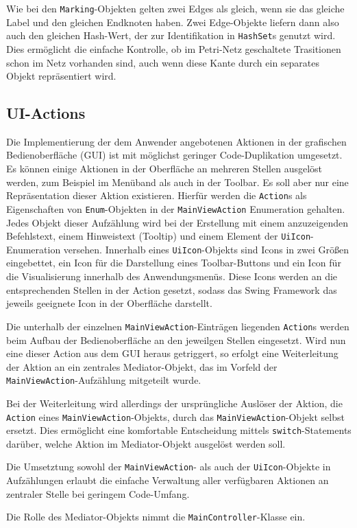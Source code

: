 Wie bei den \texttt{Marking}-Objekten gelten zwei Edges als gleich, wenn sie das
gleiche Label und den gleichen Endknoten haben. Zwei Edge-Objekte liefern dann
also auch den gleichen Hash-Wert, der zur Identifikation in \texttt{HashSet}s
genutzt wird. Dies ermöglicht die einfache Kontrolle, ob im Petri-Netz
geschaltete Trasitionen schon im Netz vorhanden sind, auch wenn diese Kante
durch ein separates Objekt repräsentiert wird.

\subsection{UI-Actions}
Die Implementierung der dem Anwender angebotenen Aktionen in der grafischen
Bedienoberfläche (GUI) ist mit möglichst geringer Code-Duplikation umgesetzt. Es
können einige Aktionen in der Oberfläche an mehreren Stellen ausgelöst werden,
zum Beispiel im Menüband als auch in der Toolbar. Es soll aber nur eine
Repräsentation dieser Aktion existieren. Hierfür werden die \texttt{Action}s als
Eigenschaften von \texttt{Enum}-Objekten in der \texttt{MainViewAction}
Enumeration gehalten. Jedes Objekt dieser Aufzählung wird bei der Erstellung mit
einem anzuzeigenden Befehlstext, einem Hinweistext (Tooltip) und einem Element
der \texttt{UiIcon}-Enumeration versehen. Innerhalb eines
\texttt{UiIcon}-Objekts sind Icons in zwei Größen eingebettet, ein Icon für die
Darstellung eines Toolbar-Buttons und ein Icon für die Visualisierung innerhalb
des Anwendungsmenüs. Diese Icons werden an die entsprechenden Stellen in der
Action gesetzt, sodass das Swing Framework das jeweils geeignete Icon in der
Oberfläche darstellt.

Die unterhalb der einzelnen \texttt{MainViewAction}-Einträgen liegenden
\texttt{Action}s werden beim Aufbau der Bedienoberfläche an den jeweilgen
Stellen eingesetzt. Wird nun eine dieser Action aus dem GUI heraus getriggert,
so erfolgt eine Weiterleitung der Aktion an ein zentrales Mediator-Objekt, das
im Vorfeld der \texttt{MainViewAction}-Aufzählung mitgeteilt wurde.

Bei der Weiterleitung wird allerdings der ursprüngliche Auslöser der Aktion, die
\texttt{Action} eines \texttt{MainViewAction}-Objekts, durch das
\texttt{MainViewAction}-Objekt selbst ersetzt. Dies ermöglicht eine komfortable
Entscheidung mittels \texttt{switch}-Statements darüber, welche Aktion im
Mediator-Objekt ausgelöst werden soll.

Die Umsetztung sowohl der \texttt{MainViewAction}- als auch der
\texttt{UiIcon}-Objekte in Aufzählungen erlaubt die einfache Verwaltung aller
verfügbaren Aktionen an zentraler Stelle bei geringem Code-Umfang.

Die Rolle des Mediator-Objekts nimmt die \texttt{MainController}-Klasse ein.